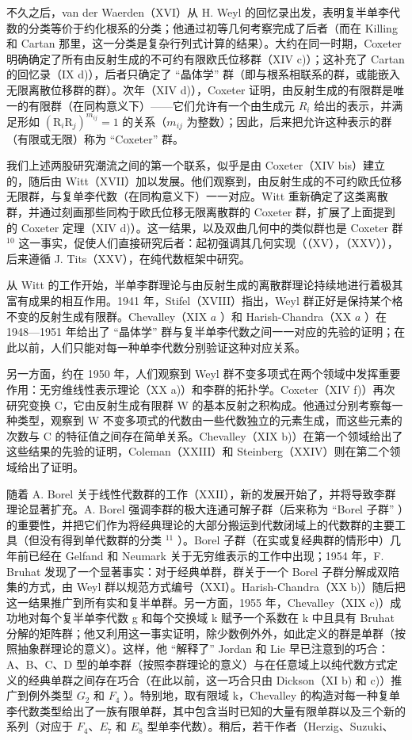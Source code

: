   不久之后，van der Waerden（XVI）从 H. Weyl 的回忆录出发，表明复半单李代数的分类等价于约化根系的分类；他通过初等几何考察完成了后者（而在 Killing 和 Cartan 那里，这一分类是复杂行列式计算的结果）。大约在同一时期，Coxeter 明确确定了所有由反射生成的不可约有限欧氏位移群（XIV c)）；这补充了 Cartan 的回忆录（IX d)），后者只确定了 ``晶体学'' 群（即与根系相联系的群，或能嵌入无限离散位移群的群）。次年（XIV d)），Coxeter 证明，由反射生成的有限群是唯一的有限群（在同构意义下）——它们允许有一个由生成元 \(R_{i}\) 给出的表示，并满足形如 \((\mathrm{R}_{i}\mathrm{R}_{j})^{m_{ij}} = 1\) 的关系（\(m_{ij}\) 为整数）；因此，后来把允许这种表示的群（有限或无限）称为 ``Coxeter'' 群。

我们上述两股研究潮流之间的第一个联系，似乎是由 Coxeter（XIV bis）建立的，随后由 Witt（XVII）加以发展。他们观察到，由反射生成的不可约欧氏位移无限群，与复单李代数（在同构意义下）一一对应。Witt 重新确定了这类离散群，并通过刻画那些同构于欧氏位移无限离散群的 Coxeter 群，扩展了上面提到的 Coxeter 定理（XIV d)）。这一结果，以及双曲几何中的类似群也是 Coxeter 群 \(^{10}\) 这一事实，促使人们直接研究后者：起初强调其几何实现（（XV），（XXV）），后来遵循 J. Tits（XXV），在纯代数框架中研究。

  从 Witt 的工作开始，半单李群理论与由反射生成的离散群理论持续地进行着极其富有成果的相互作用。1941 年，Stifel（XVIII）指出，Weyl 群正好是保持某个格不变的反射生成有限群。Chevalley（XIX \(a\) ）和 Harish-Chandra（XX \(a\) ）在 1948—1951 年给出了 ``晶体学'' 群与复半单李代数之间一一对应的先验的证明；在此以前，人们只能对每一种单李代数分别验证这种对应关系。

  另一方面，约在 1950 年，人们观察到 Weyl 群不变多项式在两个领域中发挥重要作用：无穷维线性表示理论（XX a)）和李群的拓扑学。Coxeter（XIV f)）再次研究变换 C，它由反射生成有限群 W 的基本反射之积构成。他通过分别考察每一种类型，观察到 W 不变多项式的代数由一些代数独立的元素生成，而这些元素的次数与 C 的特征值之间存在简单关系。Chevalley（XIX b)）在第一个领域给出了这些结果的先验的证明，Coleman（XXIII）和 Steinberg（XXIV）则在第二个领域给出了证明。

随着 A. Borel 关于线性代数群的工作（XXII），新的发展开始了，并将导致李群理论显著扩充。A. Borel 强调李群的极大连通可解子群（后来称为 ``Borel 子群'' ）的重要性，并把它们作为将经典理论的大部分搬运到代数闭域上的代数群的主要工具（但没有得到单代数群的分类 \(^{11}\) ）。Borel 子群（在实或复经典群的情形中）几年前已经在 Gelfand 和 Neumark 关于无穷维表示的工作中出现；1954 年，F. Bruhat 发现了一个显著事实：对于经典单群，群关于一个 Borel 子群分解成双陪集的方式，由 Weyl 群以规范方式编号（XXI）。Harish-Chandra（XX b)）随后把这一结果推广到所有实和复半单群。另一方面，1955 年，Chevalley（XIX c)）成功地对每个复半单李代数 g 和每个交换域 k 赋予一个系数在 k 中且具有 Bruhat 分解的矩阵群；他又利用这一事实证明，除少数例外外，如此定义的群是单群（按照抽象群理论的意义）。这样，他 ``解释了'' Jordan 和 Lie 早已注意到的巧合：A、B、C、D 型的单李群（按照李群理论的意义）与在任意域上以纯代数方式定义的经典单群之间存在巧合（在此以前，这一巧合只由 Dickson（XI b) 和 c)）推广到例外类型 \(G_{2}\) 和 \(F_{4}\) ）。特别地，取有限域 k，Chevalley 的构造对每一种复单李代数类型给出了一族有限单群，其中包含当时已知的大量有限单群以及三个新的系列（对应于 \(F_{4}\)、\(E_{7}\) 和 \(E_{8}\) 型单李代数）。稍后，若干作者（Herzig、Suzuki、

